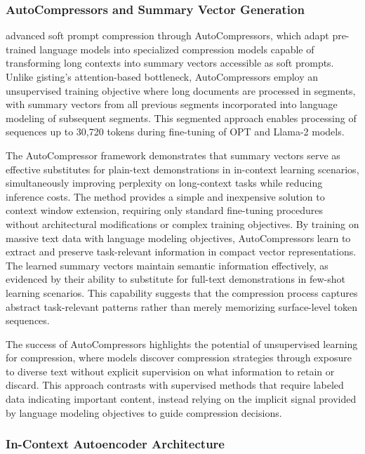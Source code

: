 \subsubsection{AutoCompressors and Summary Vector Generation}

\citet{chevalier2023adapting} advanced soft prompt compression through AutoCompressors, which adapt pre-trained language models into specialized compression models capable of transforming long contexts into summary vectors accessible as soft prompts. Unlike gisting's attention-based bottleneck, AutoCompressors employ an unsupervised training objective where long documents are processed in segments, with summary vectors from all previous segments incorporated into language modeling of subsequent segments. This segmented approach enables processing of sequences up to 30,720 tokens during fine-tuning of OPT and Llama-2 models.

The AutoCompressor framework demonstrates that summary vectors serve as effective substitutes for plain-text demonstrations in in-context learning scenarios, simultaneously improving perplexity on long-context tasks while reducing inference costs. The method provides a simple and inexpensive solution to context window extension, requiring only standard fine-tuning procedures without architectural modifications or complex training objectives. By training on massive text data with language modeling objectives, AutoCompressors learn to extract and preserve task-relevant information in compact vector representations. The learned summary vectors maintain semantic information effectively, as evidenced by their ability to substitute for full-text demonstrations in few-shot learning scenarios. This capability suggests that the compression process captures abstract task-relevant patterns rather than merely memorizing surface-level token sequences.

The success of AutoCompressors highlights the potential of unsupervised learning for compression, where models discover compression strategies through exposure to diverse text without explicit supervision on what information to retain or discard. This approach contrasts with supervised methods that require labeled data indicating important content, instead relying on the implicit signal provided by language modeling objectives to guide compression decisions.

\subsubsection{In-Context Autoencoder Architecture}

